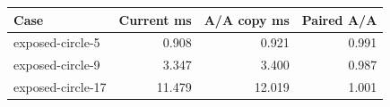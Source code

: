 \begin{center}\small
\begin{tabular}{lrrr}
\toprule
Case & Current ms & A/A copy ms & Paired A/A \\
\midrule
exposed-circle-5 & 0.908 & 0.921 & 0.991 \\
exposed-circle-9 & 3.347 & 3.400 & 0.987 \\
exposed-circle-17 & 11.479 & 12.019 & 1.001 \\
\bottomrule
\end{tabular}
\end{center}

